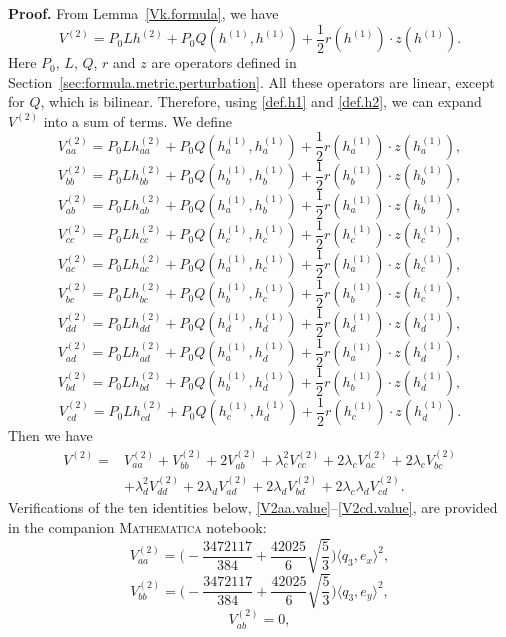 \documentclass[11pt]{amsart}
\theoremstyle{definition}
\begin{document}
\textbf{Proof.} 
From Lemma~\ref{Vk.formula}, we have 
\[
V^{(2)}=P_0L h^{(2)}+P_0Q(h^{(1)},h^{(1)})+\frac{1}{2}r(h^{(1)})\cdot z(h^{(1)}).
\]
Here $P_0$, $L$, $Q$, $r$ and $z$ are operators defined in Section~\ref{sec:formula.metric.perturbation}.
All these operators are linear, except for $Q$, which is bilinear. 
Therefore, using \eqref{def.h1} and \eqref{def.h2}, we can expand $V^{(2)}$ into a sum of terms.
We define
\[V^{(2)}_{aa}=P_0L h^{(2)}_{aa}+P_0Q(h^{(1)}_a,h^{(1)}_a)+\frac{1}{2} r(h^{(1)}_a)\cdot z(h^{(1)}_a),\] 
\[V^{(2)}_{bb}=P_0L h^{(2)}_{bb}+P_0Q(h^{(1)}_b,h^{(1)}_b)+\frac{1}{2} r(h^{(1)}_b)\cdot z(h^{(1)}_b),\] 
\[V^{(2)}_{ab}=P_0L h^{(2)}_{ab}+P_0Q(h^{(1)}_a,h^{(1)}_b)+\frac{1}{2} r(h^{(1)}_a)\cdot z(h^{(1)}_b),\] 
\[V^{(2)}_{cc}=P_0L h^{(2)}_{cc}+P_0Q(h^{(1)}_c,h^{(1)}_c)+\frac{1}{2} r(h^{(1)}_c)\cdot z(h^{(1)}_c),\] 
\[V^{(2)}_{ac}=P_0L h^{(2)}_{ac}+P_0Q(h^{(1)}_a,h^{(1)}_c)+\frac{1}{2} r(h^{(1)}_a)\cdot z(h^{(1)}_c),\]
\[V^{(2)}_{bc}=P_0L h^{(2)}_{bc}+P_0Q(h^{(1)}_b,h^{(1)}_c)+\frac{1}{2} r(h^{(1)}_b)\cdot z(h^{(1)}_c),\]
\[V^{(2)}_{dd}=P_0L h^{(2)}_{dd}+P_0Q(h^{(1)}_d,h^{(1)}_d)+\frac{1}{2} r(h^{(1)}_d)\cdot z(h^{(1)}_d),\]
\[V^{(2)}_{ad}=P_0L h^{(2)}_{ad}+P_0Q(h^{(1)}_a,h^{(1)}_d)+\frac{1}{2} r(h^{(1)}_a)\cdot z(h^{(1)}_d),\]
\[V^{(2)}_{bd}=P_0L h^{(2)}_{bd}+P_0Q(h^{(1)}_b,h^{(1)}_d)+\frac{1}{2} r(h^{(1)}_b)\cdot z(h^{(1)}_d),\]
\[V^{(2)}_{cd}=P_0L h^{(2)}_{cd}+P_0Q(h^{(1)}_c,h^{(1)}_d)+\frac{1}{2} r(h^{(1)}_c)\cdot z(h^{(1)}_d).\]
Then we have
\begin{align*}
V^{(2)}= &V^{(2)}_{aa}+V^{(2)}_{bb}+2V^{(2)}_{ab}+\lambda_c^2 V^{(2)}_{cc}+2\lambda_c V^{(2)}_{ac}+2\lambda_c V^{(2)}_{bc}\\
&+\lambda_d^2 V^{(2)}_{dd}+2\lambda_d V^{(2)}_{ad}+2\lambda_d V^{(2)}_{bd}+2\lambda_c\lambda_d V^{(2)}_{cd}.    
\end{align*}
Verifications of the ten identities below, \eqref{V2aa.value}--\eqref{V2cd.value}, are provided in the companion \textsc{Mathematica} notebook:
\begin{equation}\label{V2aa.value}
V^{(2)}_{aa}= \Big ( -\frac{3472117}{384}+\frac{42025}{6}\sqrt{\frac{5}{3}} \Big ) \langle q_3,e_x\rangle^2,
\end{equation}
\begin{equation}\label{V2bb.value}
V^{(2)}_{bb}= \Big ( -\frac{3472117}{384}+\frac{42025}{6}\sqrt{\frac{5}{3}} \Big ) \langle q_3,e_y\rangle^2,
\end{equation}
\begin{equation}\label{V2ab.value}
V^{(2)}_{ab}=0,
\end{equation}
\end{document}
